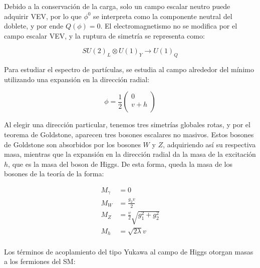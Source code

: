 Debido a la conservación de la carga, solo un campo escalar neutro puede adquirir VEV, por lo que $\phi^0$ se interpreta como la componente neutral del doblete, 
y por ende $Q(\phi)=0$. El electromagnetismo no se modifica por el campo escalar VEV, y la ruptura de simetría se representa como:

\begin{equation}
SU(2)_L \otimes U(1)_Y \rightarrow U(1)_Q
\end{equation}

Para estudiar el espectro de partículas, se estudia al campo alrededor del mínimo utilizando una expansión en la dirección radial:

\begin{equation}
	\phi = \frac{1}{2}
	\begin{pmatrix}
	0 \\
	v + h \\
	\end{pmatrix}
\end{equation}

Al elegir una dirección particular, tenemos tres simetrías globales rotas, y por el teorema de Goldstone, aparecen tres bosones escalares no masivos. Estos bosones de Goldstone son absorbidos por los bosones $W$ y $Z$, adquiriendo así su respectiva masa, 
mientras que la expansión en la dirección radial da la masa de la excitación $h$, que es la masa del boson de Higgs. De esta forma, queda la masa de los bosones de la teoría de la forma:

\begin{equation}
\begin{split}
	M_{\gamma} & = 0 \\
	M_{W} & = \frac{g_2 v}{2} \\
	M_{Z} & = \frac{v}{2}\sqrt{g_1^2 + g_2^2} \\
	M_{h} & = \sqrt{2\lambda}v \\
\end{split}
\end{equation}

Los términos de acoplamiento del tipo Yukawa al campo de Higgs otorgan masas a los fermiones del SM:

